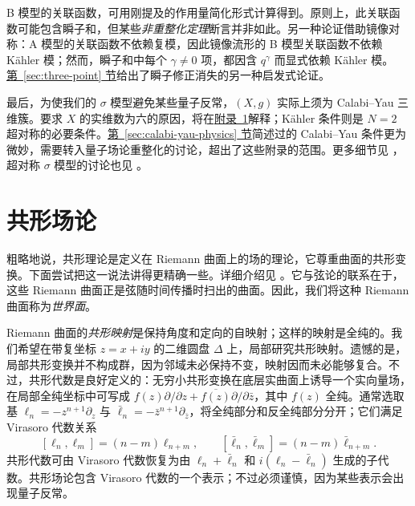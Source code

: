B 模型的关联函数，可用刚提及的作用量简化形式计算得到。原则上，此关联函数可能包含瞬子和，但某些\emph{非重整化定理}断言并非如此。另一种论证借助镜像对称：A 模型的关联函数不依赖复模，因此镜像流形的 B 模型关联函数不依赖 Kähler 模；然而，瞬子和中每个 $\gamma\ne0$ 项，都因含 $q^\gamma$ 而显式依赖 Kähler 模。\hyperref[sec:three-point]{第~\ref*{sec:three-point} 节}给出了瞬子修正消失的另一种启发式论证。

最后，为使我们的 $\sigma$ 模型避免某些量子反常，$(X,g)$ 实际上须为 Calabi--Yau 三维簇。要求 $X$ 的实维数为六的原因，将在\hyperref[sec:conformal-field-theories]{附录~\ref*{sec:conformal-field-theories}}解释；Kähler 条件则是 $N=2$ 超对称的必要条件。\hyperref[sec:calabi-yau-physics]{第~\ref*{sec:calabi-yau-physics} 节}简述过的 Calabi--Yau 条件更为微妙，需要转入量子场论重整化的讨论，超出了这些附录的范围。更多细节见 ，超对称 $\sigma$ 模型的讨论也见 。

\section{共形场论}\label{sec:conformal-field-theories}
粗略地说，共形理论是定义在 Riemann 曲面上的场的理论，它尊重曲面的共形变换。下面尝试把这一说法讲得更精确一些。详细介绍见 。它与弦论的联系在于，这些 Riemann 曲面正是弦随时间传播时扫出的曲面。因此，我们将这种 Riemann 曲面称为\emph{世界面}。

Riemann 曲面的\emph{共形映射}是保持角度和定向的自映射；这样的映射是全纯的。我们希望在带复坐标 $z=x+iy$ 的二维圆盘 $\Delta$ 上，局部研究共形映射。遗憾的是，局部共形变换并不构成群，因为邻域未必保持不变，映射因而未必能够复合。不过，共形代数是良好定义的：无穷小共形变换在底层实曲面上诱导一个实向量场，在局部全纯坐标中可写成 $f(z)\partial/\partial z+\overline{f(z)}\partial/\partial\bar z$，其中 $f(z)$ 全纯。通常选取基 $\ell_n=-z^{n+1}\partial_z$ 与 $\bar\ell_n=-\bar z^{n+1}\partial_{\bar z}$，将全纯部分和反全纯部分分开；它们满足 Virasoro 代数关系
\[
[\ell_n,\ell_m]=(n-m)\ell_{n+m},\qquad
[\bar\ell_n,\bar\ell_m]=(n-m)\bar\ell_{n+m}.
\]
共形代数可由 Virasoro 代数恢复为由 $\ell_n+\bar\ell_n$ 和 $i(\ell_n-\bar\ell_n)$ 生成的子代数。共形场论包含 Virasoro 代数的一个表示；不过必须谨慎，因为某些表示会出现量子反常。

